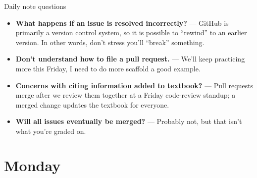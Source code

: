 \documentclass[9pt,aspectratio=169]{beamer}
\begin{document}
\begin{frame}{Daily note questions}
    \begin{itemize}\small 
        \item \textbf{What happens if an issue is resolved incorrectly?} --- GitHub is primarily a version control system, so it is possible to ``rewind'' to an earlier version. In other words, don't stress you'll ``break'' something.
        \item \textbf{Don't understand how to file a pull request.} --- We'll keep practicing more this Friday, I need to do more scaffold a good example.
        \item \textbf{Concerns with citing information added to textbook?} --- Pull requests merge after we review them together at a Friday code-review standup; a merged change updates the textbook for everyone.
        \item \textbf{Will all issues eventually be merged?} --- Probably not, but that isn't what you're graded on.
    \end{itemize}
\end{frame}

\section{Monday}
\end{document}
